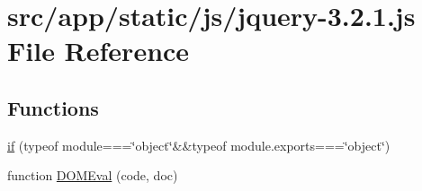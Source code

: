 \hypertarget{jquery-3_82_81_8js}{}\section{src/app/static/js/jquery-\/3.2.1.js File Reference}
\label{jquery-3_82_81_8js}
\subsection*{Functions}
\begin{DoxyCompactItemize}
\item 
\hyperlink{jquery-3_82_81_8js_ae0fffdeee42645efd27f6d8cbf2e7660}{if} (typeof module===\char`\"{}object\char`\"{}\&\&typeof module.\+exports===\char`\"{}object\char`\"{})
\item 
function \hyperlink{jquery-3_82_81_8js_a26e7be743f83d9e2dd9862b2a6c72b84}{D\+O\+M\+Eval} (code, doc)
\item 

\end{DoxyCompactItemize}
